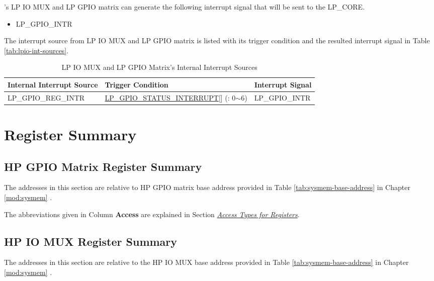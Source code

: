 \documentclass[main\_\_EN.tex]{subfiles}
\begin{document}
\chipname{}'s LP IO MUX and LP GPIO matrix can generate the following interrupt signal that will be sent to the LP\_CORE.

    \begin{itemize}
        \item LP\_GPIO\_INTR
    \end{itemize}

The interrupt source from LP IO MUX and LP GPIO matrix is listed with its trigger condition and the resulted interrupt signal in Table \ref{tab:lpio-int-sources}.
\begin{longtable}{ | L{5cm} | L{7.0cm} | L{3.5cm} | }
\caption{LP IO MUX and LP GPIO Matrix's Internal Interrupt Sources} \label{tab:lpio-int-sources}
\\ \hline
{}
\textbf{Internal Interrupt Source} & \textbf{Trigger Condition}  &  \textbf{Interrupt Signal}\\ \hline

\label{int:LPGPIOINT}LP\_GPIO\_REG\_INTR  &  \hyperref[fielddesc:LPGPIOSTATUSINTERRUPT]{LP\_GPIO\_STATUS\_INTERRUPT}[] (: 0$\sim$6) &  LP\_GPIO\_INTR  \\ \hline
\end{longtable}

\hypertarget{iomuxgpio-reg-summ}{}
\section{Register Summary}
\subsection{HP GPIO Matrix Register Summary}
\label{sec:hp-gpio-reg-summ}

The addresses in this section are relative to HP GPIO matrix base address provided in Table \ref{tab:sysmem-base-address} in Chapter \ref{mod:sysmem} \textit{}.

The abbreviations given in Column \textbf{Access} are explained in Section \hyperref[glossary-access-types]{\textit{Access Types for Registers}}.




\subsection{HP IO MUX Register Summary}
The addresses in this section are relative to the HP IO MUX base address provided in Table \ref{tab:sysmem-base-address} in Chapter \ref{mod:sysmem} \textit{}.
\end{document}
